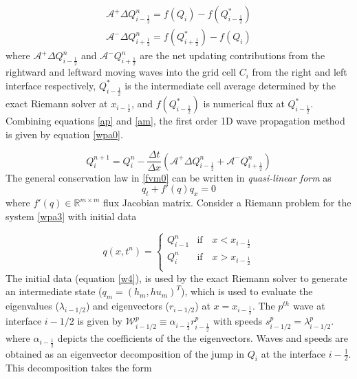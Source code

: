 \documentclass[12pt,a4paper]{article}
\begin{document}
	\begin{eqnarray}
		\mathcal{A^{+}}\Delta Q_{i-\frac{1}{2}}^{n} = f(Q_{i}) - f(Q_{i-\frac{1}{2}}^{*})
		\label{ap}\\
		\mathcal{A^{-}}\Delta Q_{i+\frac{1}{2}}^{n} = f(Q_{i+\frac{1}{2}}^{*}) - f(Q_{i}) 
		\label{am}
	\end{eqnarray}	
	  where  $\mathcal{A^{+}}\Delta 	Q_{i-\frac{1}{2}}^{n}$ and  $\mathcal{A^{-}}Q_{i+\frac{1}{2}}^{n}$ are the net updating contributions from the rightward and leftward moving waves into the grid cell $C_{i}$  from the right and left interface respectively,  $Q_{i-\frac{1}{2}}^{*}$ is the intermediate cell average determined by the exact Riemann solver at $x_{i-\frac{1}{2}}$, and $ f(Q_{i-\frac{1}{2}}^{*})$ is numerical flux at $Q_{i-\frac{1}{2}}^{*}$. Combining equations \eqref{ap} and \eqref{am}, the  first order 1D  wave propagation method is given by equation \eqref{wpa0}.
	
	\begin{equation}
		Q_{i}^{n+1} =  Q_{i}^{n} - \frac{\Delta t}{\Delta x}(\mathcal{A^{+}}\Delta 	Q_{i-\frac{1}{2}}^{n} + \mathcal{A^{-}}Q_{i+\frac{1}{2}}^{n})
		\label{wpa0}
	\end{equation}
	\label{section:my}
	The general conservation law in \eqref{fvm0} can be written in {\em quasi-linear form}
	as
	\begin{equation}
		q_{t} + f'(q)q_{x} = 0
		\label{wpa3}
	\end{equation}
	where  $f'(q) \in \mathbb{R}^{m\times m}$  flux Jacobian matrix.  Consider a Riemann problem for the system  \eqref{wpa3} with initial data 
	
	\begin{equation}
		q(x,t^n)  = \begin{cases}
			Q_{i-1}^{n}  & \text{if} \quad  x < x_{i-\frac{1}{2}}\\
			Q_{i}^{n} & \text{if} \quad x > x_{i-\frac{1}{2}}\\
		\end{cases}    
		\label{w4}   
	\end{equation}
	The initial data (equation \eqref{w4}), is used by the exact Riemann solver to generate an intermediate state ($q_m = (h_m, hu_m)^T$), which is used to evaluate the eigenvalues ($\lambda_{i-1/2}$) and eigenvectors ($r_{i-1/2}$) at $x = x_{i-\frac{1}{2}}$. The $p^{th}$ wave at interface $i-1/2$ is given by $\mathcal W^p_{i-1/2} \equiv \alpha_{i-\frac{1}{2}} r^p_{i-\frac{1}{2}}$ with speeds $s^p_{i-1/2} = \lambda^p_{i-1/2}$. where $ \alpha_{i-\frac{1}{2}}$ depicts the coefficients of the the eigenvectors.  Waves and speeds are obtained as an eigenvector decomposition of the jump in $Q_i$ at the interface $i-\frac{1}{2}$.  This decomposition takes the form
	 
\end{document}
